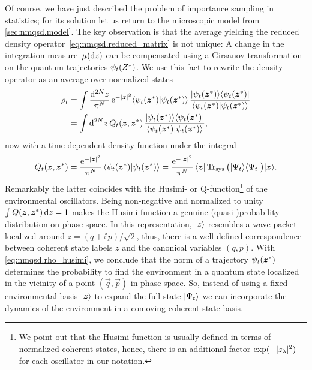 Of course, we have just described the problem of importance sampling in statistics; for its solution let us return to the microscopic model from \autoref{sec:nmqsd.model}.
The key observation is that the average yielding the reduced density operator~\ref{eq:nmqsd.reduced_matrix} is not unique:
A change in the integration measure $\, \mu(\mathrm{d} z)$ can be compensated using a Girsanov transformation on the quantum trajectories $\psitZ$.
We use this fact to rewrite the density operator as an average over normalized states
\begin{align}
  \label{eq:nmqsd.rho_husimi}
  \rho_t &= \int \frac{\mathrm{d}^{2N} z}{\pi^N} \, \exp[-\abs{\zz}^2] \braket{\psitz}{\psitz} \, \frac{\ket{\psitz}\bra{\psitz}}{\braket{\psitz}{\psitz}} \\
  &= \int \mathrm{d}^{2N}z \, Q_t(\zz, \cc\zz) \, \frac{\ket{\psitz}\bra{\psitz}}{\braket{\psitz}{\psitz}},
\end{align}
now with a time dependent density function under the integral
\begin{equation}
  Q_t(\zz, \cc\zz) = \frac{\exp[-\abs{\zz}^2]}{\pi^N}\, \braket{\psitz}{\psitz}
                   = \frac{\exp[-\abs{\zz}^2]}{\pi^N}\, \bra{\zz} \Tr_\mathrm{sys} \big( \ket{\Psi_t}\bra{\Psi_t} \big)\ket{\zz}.
    \label{eq:nmqsd.husimi}
\end{equation}
Remarkably the latter coincides with the Husimi- or Q-function\footnote{%
  We point out that the Husimi function is usually defined in terms of normalized coherent states, hence, there is an additional factor $\exp(-\abs{z_\lambda}^2)$ for each oscillator in our notation.
}
of the environmental oscillators\cite{Sc11_quantum_optics}.
Being non-negative and normalized to unity $\int Q(\boldsymbol{z}, {\boldsymbol{z}}^*) \, \mathrm{d} z = 1$ makes the Husimi-function a genuine (quasi-)probability distribution on phase space.
In this representation, $| z \rangle$ resembles a wave packet localized around $z = (q + \ii \, p) / \sqrt{2}$, thus, there is a well defined correspondence between coherent state labels $z$ and the canonical variables $(q, p)$.
With \autoref{eq:nmqsd.rho_husimi}, we conclude that the norm of a trajectory $\psitz$ determines the probability to find the environment in a quantum state localized in the vicinity of a point $(\vec q, \vec p)$ in phase space.
So, instead of using a fixed environmental basis $| \boldsymbol{z} \rangle$ to expand the full state $| \Psi_t \rangle$ we can incorporate the dynamics of the environment in a comoving coherent state basis.


